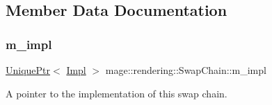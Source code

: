 \subsection{Member Data Documentation}
\hypertarget{classmage_1_1rendering_1_1_swap_chain_a983645d6494b7e731753def5356bb8e6}{}\label{classmage_1_1rendering_1_1_swap_chain_a983645d6494b7e731753def5356bb8e6} 
\subsubsection{\texorpdfstring{m\+\_\+impl}{m\_impl}}
{\footnotesize\ttfamily \hyperlink{namespacemage_a3316d7143a973e37adf1110f2e80ca31}{Unique\+Ptr}$<$ \hyperlink{classmage_1_1rendering_1_1_swap_chain_1_1_impl}{Impl} $>$ mage\+::rendering\+::\+Swap\+Chain\+::m\+\_\+impl\hspace{0.3cm}{\ttfamily [private]}}

A pointer to the implementation of this swap chain. 